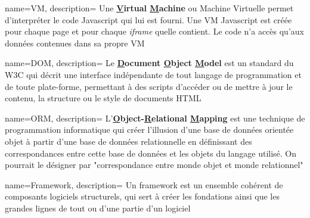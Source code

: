 {
    name=VM,
    description=
    {
        Une \textbf{\underline{V}irtual \underline{M}achine} ou Machine Virtuelle permet d'interpréter le code Javascript qui lui est fourni. Une VM Javascript est créée pour chaque page et pour chaque \textit{iframe} quelle contient. Le code n'a accès qu'aux données contenues dans sa propre VM
    }
}

{
    name=DOM,
    description=
    {
        Le \textbf{\underline{D}ocument \underline{O}bject \underline{M}odel} est un standard du W3C qui décrit une interface indépendante de tout langage de programmation et de toute plate-forme, permettant à des scripts d'accéder ou de mettre à jour le contenu, la structure ou le style de documents HTML
    }
}

{
    name=ORM,
    description=
    {
        L'\textbf{\underline{O}bject-\underline{R}elational \underline{M}apping} est une technique de programmation informatique qui créer l'illusion d'une base de données orientée objet à partir d'une base de données relationnelle en définissant des correspondances entre cette base de données et les objets du langage utilisé. On pourrait le désigner par "correspondance entre monde objet et monde relationnel"
    }
}

{
    name=Framework,
    description=
    {
        Un framework est un ensemble cohérent de composants logiciels structurels, qui sert à créer les fondations ainsi que les grandes lignes de tout ou d’une partie d'un logiciel
    }
}